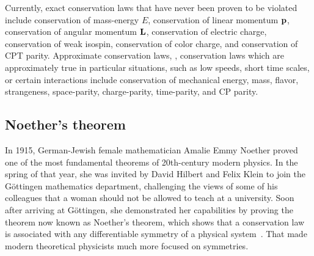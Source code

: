 Currently, exact conservation laws that have never been proven to be violated include conservation of mass-energy $E$, conservation of linear momentum $\vb{p}$, conservation of angular momentum $\vb{L}$, conservation of electric charge, conservation of weak isospin, conservation of color charge, and conservation of CPT parity. Approximate conservation laws, \ie, conservation laws which are approximately true in particular situations, such as low speeds, short time scales, or certain interactions include conservation of mechanical energy, mass, flavor, strangeness, space-parity, charge-parity, time-parity, and CP parity.

\subsection{Noether's theorem}
\label{sec:noethers-theorem}

In 1915, German-Jewish female mathematician Amalie Emmy Noether proved one of the most fundamental theorems of 20th-century modern physics. In the spring of that year, she was invited by David Hilbert and Felix Klein to join the Göttingen mathematics department, challenging the views of some of his colleagues that a woman should not be allowed to teach at a university. Soon after arriving at Göttingen, she demonstrated her capabilities by proving the theorem now known as Noether's theorem, which shows that a conservation law is associated with any differentiable symmetry of a physical system~\cite{Lederman2004-fl}. That made modern theoretical physicists much more focused on symmetries.

